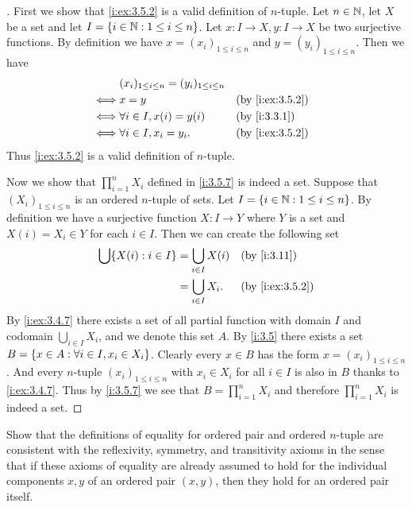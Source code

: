 \begin{proof}[]
  First we show that \cref{i:ex:3.5.2} is a valid definition of \(n\)-tuple.
  Let \(n \in \mathbb{N}\), let \(X\) be a set and let \(I = \left\lbrace i \in \mathbb{N} : 1 \leq i \leq n\right\rbrace\).
  Let \(x : I \to X, y : I \to X\) be two surjective functions.
  By definition we have \(x = (x_i)_{1 \leq i \leq n}\) and \(y = (y_i)_{1 \leq i \leq n}\).
  Then we have
  \begin{align*}
         & (x_i)_{1 \leq i \leq n} = (y_i)_{1 \leq i \leq n}                      \\
    \iff & x = y                                             &  & \by{i:ex:3.5.2} \\
    \iff & \forall i \in I, x(i) = y(i)                      &  & \by{i:3.3.1}    \\
    \iff & \forall i \in I, x_i = y_i.                       &  & \by{i:ex:3.5.2}
  \end{align*}
  Thus \cref{i:ex:3.5.2} is a valid definition of \(n\)-tuple.

  Now we show that \(\prod_{i = 1}^n X_i\) defined in \cref{i:3.5.7} is indeed a set.
  Suppose that \((X_i)_{1 \leq i \leq n}\) is an ordered \(n\)-tuple of sets.
  Let \(I = \left\lbrace i \in \mathbb{N} : 1 \leq i \leq n\right\rbrace\).
  By definition we have a surjective function \(X : I \to Y\) where \(Y\) is a set and \(X(i) = X_i \in Y\) for each \(i \in I\).
  Then we can create the following set
  \begin{align*}
    \bigcup \set{X(i) : i \in I} & = \bigcup_{i \in I} X(i) &  & \by{i:3.11}     \\
                                 & = \bigcup_{i \in I} X_i. &  & \by{i:ex:3.5.2}
  \end{align*}
  By \cref{i:ex:3.4.7} there exists a set of all partial function with domain \(I\) and codomain \(\bigcup_{i \in I} X_i\), and we denote this set \(A\).
  By \cref{i:3.5} there exists a set \(B = \left\lbrace x \in A : \forall i \in I, x_i \in X_i\right\rbrace\).
  Clearly every \(x \in B\) has the form \(x = (x_i)_{1 \leq i \leq n}\).
  And every \(n\)-tuple \((x_i)_{1 \leq i \leq n}\) with \(x_i \in X_i\) for all \(i \in I\) is also in \(B\) thanks to \cref{i:ex:3.4.7}.
  Thus by \cref{i:3.5.7} we see that \(B = \prod_{i = 1}^n X_i\) and therefore \(\prod_{i = 1}^n X_i\) is indeed a set.
\end{proof}

\begin{ex}\label{i:ex:3.5.3}
  Show that the definitions of equality for ordered pair and ordered \(n\)-tuple are consistent with the reflexivity, symmetry, and transitivity axioms in the sense that if these axioms of equality are already assumed to hold for the individual components \(x, y\) of an ordered pair \((x, y)\), then they hold for an ordered pair itself.
\end{ex}

